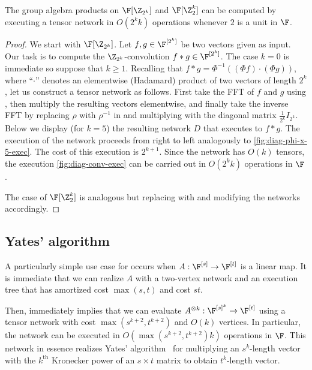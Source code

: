 \begin{lemma}
\label{lem:conv}
The group algebra products on $\F[\Z_{2^k}]$ and $\F[\Z_2^k]$
can be computed by executing a tensor network in $O(2^kk)$ operations whenever
$2$ is a unit in $\F$.
\end{lemma}
\begin{proof}
We start with $\F[\Z_{2^k}]$.
Let $f,g\in\F^{[2^k]}$ be two vectors given as input. Our task is to
compute the $\Z_{2^k}$-convolution $f*g\in\F^{[2^k]}$.
The case $k=0$ is immediate so suppose that $k\geq 1$.
Recalling that $f*g=\Phi^{-1}((\Phi f)\cdot (\Phi g))$, where
``$\cdot$'' denotes an elementwise (Hadamard) product of two vectors of
length $2^k$, let us construct a tensor network as follows.
First take the FFT of $f$ and $g$ using ,
then multiply the resulting vectors elementwise, and
finally take the inverse FFT by
replacing $\rho$ with $\rho^{-1}$ in  and
multiplying with the diagonal matrix $\frac{1}{2^k}I_{2^k}$.
Below we display (for $k=5$) the resulting network $D$ that executes to $f*g$.
The execution of the network proceeds from right to left analogously to
\eqref{fig:diag-phi-x-5-exec}.
The cost of this execution is $2^{k+1}$.
Since the network has $O(k)$ tensors, the execution
\eqref{fig:diag-conv-exec} can be carried out in $O(2^kk)$ operations in $\F$.

The case of $\F[\Z_2^k]$ is analogous but replacing 
with  and modifying the networks accordingly.
\end{proof}



\subsection{Yates' algorithm}

A particularly simple use case for 
occurs when $A:\F^{[s]}\rightarrow\F^{[t]}$ is a linear map.
It is immediate that we can realize $A$ with a two-vertex
network and an execution tree that has amortized cost $\max(s,t)$
and cost $st$.

Then,  immediately implies that we can evaluate
$A^{\otimes k}:\F^{[s]^k}\rightarrow\F^{[t]}$ using a tensor network
with cost $\max(s^{k+2},t^{k+2})$ and $O(k)$ vertices. In particular, the
network can be executed in $O(\max(s^{k+2},t^{k+2})k)$ operations in $\F$.
This network in essence realizes Yates' algorithm~\cite{Yates1937}
for multiplying an $s^k$-length vector with the $k^\text{th}$
Kronecker power of an $s\times t$ matrix to obtain $t^k$-length vector.

